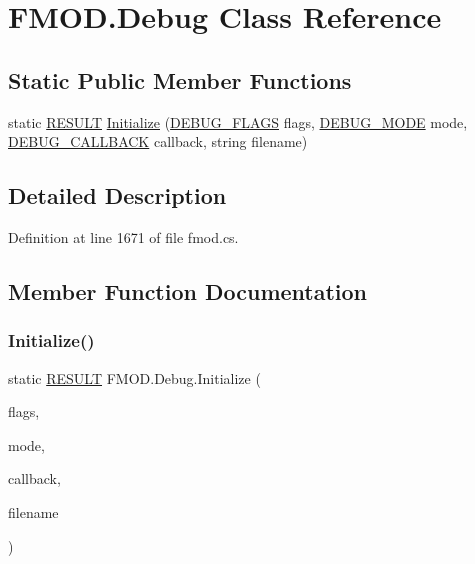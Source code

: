 \hypertarget{class_f_m_o_d_1_1_debug}{}\section{F\+M\+O\+D.\+Debug Class Reference}
\label{class_f_m_o_d_1_1_debug}
\subsection*{Static Public Member Functions}
\begin{DoxyCompactItemize}
\item 
static \hyperlink{namespace_f_m_o_d_a305d1176ef3f8c8815861a60407ac33d}{R\+E\+S\+U\+LT} \hyperlink{class_f_m_o_d_1_1_debug_a102c66a7d35e1ff54375d0d6cebacd91}{Initialize} (\hyperlink{namespace_f_m_o_d_ae26c0e42bca4d9ba2b529ed29cf35b33}{D\+E\+B\+U\+G\+\_\+\+F\+L\+A\+GS} flags, \hyperlink{namespace_f_m_o_d_a51fb07f23c688e88199e560657a65c77}{D\+E\+B\+U\+G\+\_\+\+M\+O\+DE} mode, \hyperlink{namespace_f_m_o_d_a8af56b22e6aaa75d1cbe71accaa7d719}{D\+E\+B\+U\+G\+\_\+\+C\+A\+L\+L\+B\+A\+CK} callback, string filename)
\end{DoxyCompactItemize}


\subsection{Detailed Description}


Definition at line 1671 of file fmod.\+cs.



\subsection{Member Function Documentation}
\mbox{\label{class_f_m_o_d_1_1_debug_a102c66a7d35e1ff54375d0d6cebacd91}} 
\subsubsection{\texorpdfstring{Initialize()}{Initialize()}}
{\footnotesize\ttfamily static \hyperlink{namespace_f_m_o_d_a305d1176ef3f8c8815861a60407ac33d}{R\+E\+S\+U\+LT} F\+M\+O\+D.\+Debug.\+Initialize (\begin{DoxyParamCaption}\item[{\hyperlink{namespace_f_m_o_d_ae26c0e42bca4d9ba2b529ed29cf35b33}{D\+E\+B\+U\+G\+\_\+\+F\+L\+A\+GS}}]{flags,  }\item[{\hyperlink{namespace_f_m_o_d_a51fb07f23c688e88199e560657a65c77}{D\+E\+B\+U\+G\+\_\+\+M\+O\+DE}}]{mode,  }\item[{\hyperlink{namespace_f_m_o_d_a8af56b22e6aaa75d1cbe71accaa7d719}{D\+E\+B\+U\+G\+\_\+\+C\+A\+L\+L\+B\+A\+CK}}]{callback,  }\item[{string}]{filename }\end{DoxyParamCaption})\hspace{0.3cm}{\ttfamily [static]}}




